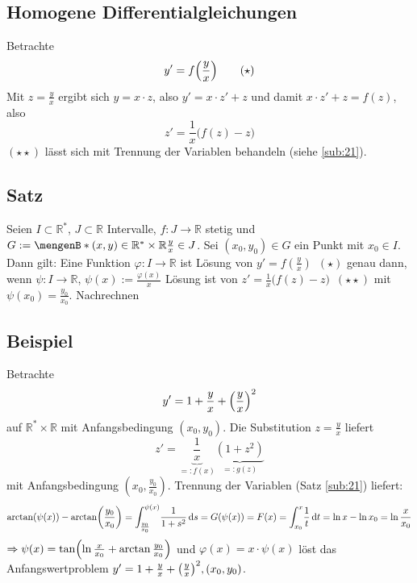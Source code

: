 \subsection{Homogene Differentialgleichungen} %
\label{sub:27}
Betrachte
\[
	y' = f \enbrace*{\frac{y}{x} } \tag{$\star$}
\]
Mit $z= \frac{y}{x} $ ergibt sich $y= x \cdot z$, also $y' = x \cdot z' + z$ und damit $x \cdot z' +z = f(z)$, also
\[
	z'=  \frac{1}{x} \big(f(z)-z\big) \tag{$\star\star$}
\]
$(\star\star)$ lässt sich mit Trennung der Variablen behandeln (siehe \ref{sub:21}). 

\subsection[Satz: Lösung von homogenen Differentialgleichungen]{Satz} %
\label{sub:27.2}
Seien $I \subset \mathds{R}^*$, $J \subset \mathds{R}$ Intervalle, $f : J \to \mathds{R}$ stetig und 
$G := \set[(x,y) \in \mathds{R}^* \times \mathds{R}]{\frac{y}{x} \in J } $. Sei $(x_0,y_0) \in G$ ein Punkt mit $x_0 \in I$. Dann gilt: Eine Funktion 
$\varphi : I \to \mathds{R}$ ist Lösung von $y'= f(\frac{y}{x} ) \enspace(\star)$ genau dann, wenn $\psi : I  \to \mathds{R}$, $\psi(x) := \frac{\varphi(x)}{x} $ Lösung ist 
von $z'= \frac{1}{x} \big(f(z)-z\big) \enspace (\star\star)$ mit $\psi(x_0)= \frac{y_0}{x_0} $.
Nachrechnen \bewende

\subsection[Beispiel zur Lösung einer homogenen DGL]{Beispiel} %
\label{sub:28}
Betrachte 
\[
	y' = 1+ \frac{y}{x} + \enbrace*{\frac{y}{x} }^2 
\]
auf $\mathds{R}^* \times \mathds{R}$ mit Anfangsbedingung $(x_0,y_0)$. Die Substitution $z=\frac{y}{x} $ liefert 
\[
	z'= \underbrace{\frac{1}{x}}_{=:f(x)} \underbrace{(1+z^2)}_{=:g(z)} 
\]
mit Anfangsbedingung $(x_0, \frac{y_0}{x_0} )$. Trennung der Variablen (Satz \ref{sub:21}) liefert:
\begin{align*}
	\arctan (\psi(x)) - \arctan \enbrace*{\frac{y_0}{x_0} }  = \int_{\frac{y_0}{x_0} } ^{\psi(x)} \! \frac{1}{1+s^2}  \, \mathrm{d}s= G(\psi(x)) = F(x) = \int_{x_0} ^{x} \! \frac{1}{t}  \, \mathrm{d}t  = \ln x - \ln x_0 = \ln \frac{x}{x_0} 
\end{align*}
$\Rightarrow \psi(x) = \tan \enbrace*{\ln \frac{x}{x_0} + \arctan \frac{y_0}{x_0} } $ und $\varphi(x)= x \cdot \psi(x)$ löst das Anfangswertproblem 
$y'= 1+ \frac{y}{x} + \enbrace*{\frac{y}{x} }^2, (x_0, y_0) $.

